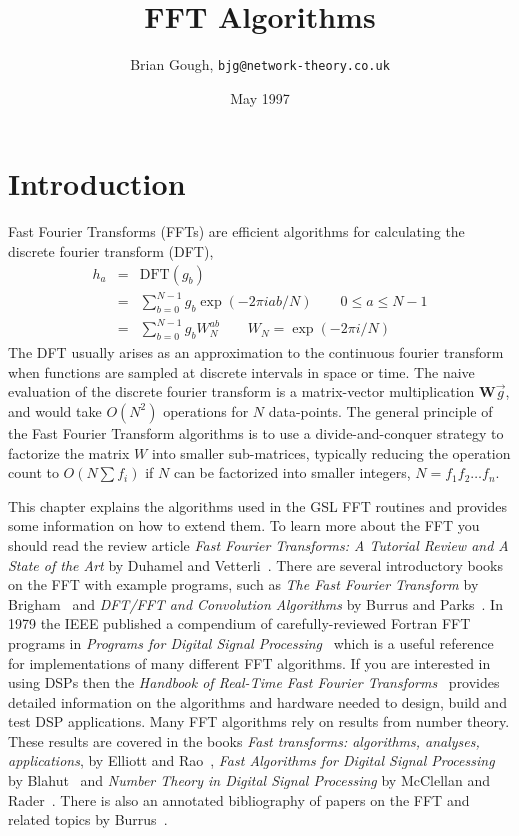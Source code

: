 \documentclass[fleqn,12pt]{article}
\begin{document}
\title{FFT Algorithms}
\author{Brian Gough, {\tt bjg@network-theory.co.uk}}
\date{May 1997}
\maketitle

\section{Introduction}

Fast Fourier Transforms (FFTs) are efficient algorithms for
calculating the discrete fourier transform (DFT),
%
\begin{eqnarray}
h_a &=& \mathrm{DFT}(g_b) \\
    &=& \sum_{b=0}^{N-1} g_b \exp(-2\pi i a b /N) \qquad 0 \leq a \leq N-1\\
    &=& \sum_{b=0}^{N-1} g_b W_N^{ab} \qquad W_N= \exp(-2\pi i/N)
\end{eqnarray}
%
The DFT usually arises as an approximation to the continuous fourier
transform when functions are sampled at discrete intervals in space or
time. The naive evaluation of the discrete fourier transform is a
matrix-vector multiplication ${\mathbf W}\vec{g}$, and would take
$O(N^2)$ operations for $N$ data-points. The general principle of the
Fast Fourier Transform algorithms is to use a divide-and-conquer
strategy to factorize the matrix $W$ into smaller sub-matrices,
typically reducing the operation count to $O(N \sum f_i)$ if $N$ can
be factorized into smaller integers, $N=f_1 f_2 \dots f_n$.

This chapter explains the algorithms used in the GSL FFT routines
and provides some information on how to extend them. To learn more about
the FFT you should read the review article {\em Fast Fourier
Transforms: A Tutorial Review and A State of the Art} by Duhamel and
Vetterli~\cite{duhamel90}. There are several introductory books on the
FFT with example programs, such as {\em The Fast Fourier Transform} by
Brigham~\cite{brigham74} and {\em DFT/FFT and Convolution Algorithms}
by Burrus and Parks~\cite{burrus84}. In 1979 the IEEE published a
compendium of carefully-reviewed Fortran FFT programs in {\em Programs
for Digital Signal Processing}~\cite{committee79} which is a useful
reference for implementations of many different FFT algorithms. If you
are interested in using DSPs then the {\em Handbook of Real-Time Fast
Fourier Transforms}~\cite{smith95} provides detailed information on
the algorithms and hardware needed to design, build and test DSP
applications. Many FFT algorithms rely on results from number theory.
These results are covered in the books {\em Fast transforms:
algorithms, analyses, applications}, by Elliott and
Rao~\cite{elliott82}, {\em Fast Algorithms for Digital Signal
Processing} by Blahut~\cite{blahut} and {\em Number Theory in Digital
Signal Processing} by McClellan and Rader~\cite{mcclellan79}. There is
also an annotated bibliography of papers on the FFT and related topics
by Burrus~\cite{burrus-note}.
\end{document}
